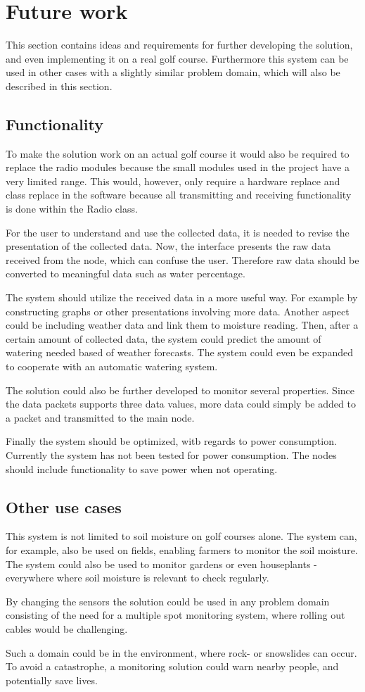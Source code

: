 \section{Future work}
This section contains ideas and requirements for further developing the solution, and even implementing it on a real golf course. Furthermore this system can be used in other cases with a slightly similar problem domain, which will also be described in this section.

\subsection{Functionality}
To make the solution work on an actual golf course it would also be required to replace the radio modules because the small modules used in the project have a very limited range. This would, however, only require a hardware replace and class replace in the software because all transmitting and receiving functionality is done within the Radio class.

For the user to understand and use the collected data, it is needed to revise the presentation of the collected data. Now, the interface presents the raw data received from the node, which can confuse the user. Therefore raw data should be converted to meaningful data such as water percentage.

The system should utilize the received data in a more useful way. For example by constructing graphs or other presentations involving more data. Another aspect could be including weather data and link them to moisture reading. Then, after a certain amount of collected data, the system could predict the amount of watering needed based of weather forecasts. The system could even be expanded to cooperate with an automatic watering system.

The solution could also be further developed to monitor several properties. Since the data packets supports three data values, more data could simply be added to a packet and transmitted to the main node.

Finally the system should be optimized, witb regards to power consumption. Currently the system has not been tested for power consumption. The nodes should include functionality to save power when not operating.

\subsection{Other use cases}
This system is not limited to soil moisture on golf courses alone. The system can, for example, also be used on fields, enabling farmers to monitor the soil moisture. The system could also be used to monitor gardens or even houseplants - everywhere where soil moisture is relevant to check regularly.

By changing the sensors the solution could be used in any problem domain consisting of the need for a multiple spot monitoring system, where rolling out cables would be challenging.

Such a domain could be in the environment, where rock- or snowslides can occur. To avoid a catastrophe, a monitoring solution could warn nearby people, and potentially save lives.